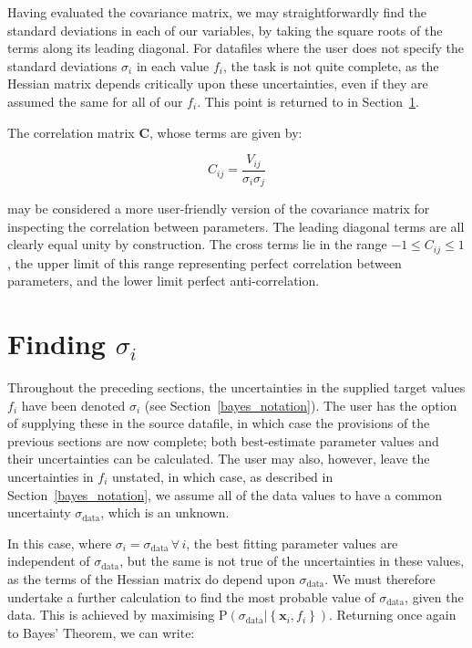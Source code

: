 \documentclass[a4paper,onecolumn,11pt]{book}
\begin{document}
Having evaluated the covariance matrix, we may straightforwardly find the
standard deviations in each of our variables, by taking the square roots of the
terms along its leading diagonal. For datafiles where the user does not specify
the standard deviations $\sigma_i$ in each value $f_i$, the task is not quite
complete, as the Hessian matrix depends critically upon these uncertainties,
even if they are assumed the same for all of our $f_i$. This point is returned
to in Section~\ref{finding_sigmai}.

The correlation matrix $\mathbf{C}$, whose terms are given by:

\begin{equation}
C_{ij} = \frac{V_{ij}}{\sigma_i\sigma_j}
\end{equation}

\noindent may be considered a more user-friendly version of the covariance
matrix for inspecting the correlation between parameters. The leading diagonal
terms are all clearly equal unity by construction. The cross terms lie in the
range $-1 \leq C_{ij} \leq 1$, the upper limit of this range representing
perfect correlation between parameters, and the lower limit perfect
anti-correlation.

\section{Finding $\sigma_i$}
\label{finding_sigmai}

Throughout the preceding sections, the uncertainties in the supplied target
values $f_i$ have been denoted $\sigma_i$ (see Section~\ref{bayes_notation}).
The user has the option of supplying these in the source datafile, in which
case the provisions of the previous sections are now complete; both
best-estimate parameter values and their uncertainties can be calculated. The
user may also, however, leave the uncertainties in $f_i$ unstated, in which
case, as described in Section~\ref{bayes_notation}, we assume all of the data
values to have a common uncertainty $\sigma_\mathrm{data}$, which is an
unknown.

In this case, where $\sigma_i = \sigma_\mathrm{data} \,\forall\, i$, the best
fitting parameter values are independent of $\sigma_\mathrm{data}$, but the
same is not true of the uncertainties in these values, as the terms of the
Hessian matrix do depend upon $\sigma_\mathrm{data}$. We must therefore
undertake a further calculation to find the most probable value of
$\sigma_\mathrm{data}$, given the data. This is achieved by maximising
$\mathrm{P}\left( \sigma_\mathrm{data} | \left\{ \mathbf{x}_i, f_i \right\}
\right)$. Returning once again to Bayes' Theorem, we can write:
\end{document}
